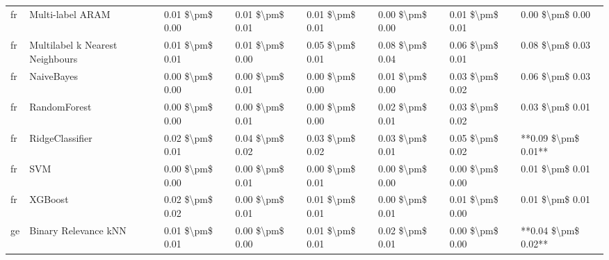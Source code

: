 \begin{tabular}{llllllll}
      fr &                Multi-label ARAM & 0.01 \$\textbackslash pm\$ 0.00 &           0.01 \$\textbackslash pm\$ 0.01 &       0.01 \$\textbackslash pm\$ 0.01 &        0.00 \$\textbackslash pm\$ 0.00 &                         0.01 \$\textbackslash pm\$ 0.01 &     0.00 \$\textbackslash pm\$ 0.00 \\
      fr & Multilabel k Nearest Neighbours & 0.01 \$\textbackslash pm\$ 0.01 &           0.01 \$\textbackslash pm\$ 0.00 &       0.05 \$\textbackslash pm\$ 0.01 &        0.08 \$\textbackslash pm\$ 0.04 &                         0.06 \$\textbackslash pm\$ 0.01 &     0.08 \$\textbackslash pm\$ 0.03 \\
      fr &                      NaiveBayes & 0.00 \$\textbackslash pm\$ 0.00 &           0.00 \$\textbackslash pm\$ 0.01 &       0.00 \$\textbackslash pm\$ 0.00 &        0.01 \$\textbackslash pm\$ 0.00 &                         0.03 \$\textbackslash pm\$ 0.02 &     0.06 \$\textbackslash pm\$ 0.03 \\
      fr &                    RandomForest & 0.00 \$\textbackslash pm\$ 0.00 &           0.00 \$\textbackslash pm\$ 0.01 &       0.00 \$\textbackslash pm\$ 0.00 &        0.02 \$\textbackslash pm\$ 0.01 &                         0.03 \$\textbackslash pm\$ 0.02 &     0.03 \$\textbackslash pm\$ 0.01 \\
      fr &                 RidgeClassifier & 0.02 \$\textbackslash pm\$ 0.01 &           0.04 \$\textbackslash pm\$ 0.02 &       0.03 \$\textbackslash pm\$ 0.02 &        0.03 \$\textbackslash pm\$ 0.01 &                         0.05 \$\textbackslash pm\$ 0.02 & **0.09 \$\textbackslash pm\$ 0.01** \\
      fr &                             SVM & 0.00 \$\textbackslash pm\$ 0.00 &           0.00 \$\textbackslash pm\$ 0.01 &       0.00 \$\textbackslash pm\$ 0.01 &        0.00 \$\textbackslash pm\$ 0.00 &                         0.00 \$\textbackslash pm\$ 0.00 &     0.01 \$\textbackslash pm\$ 0.01 \\
      fr &                         XGBoost & 0.02 \$\textbackslash pm\$ 0.02 &           0.00 \$\textbackslash pm\$ 0.01 &       0.01 \$\textbackslash pm\$ 0.01 &        0.00 \$\textbackslash pm\$ 0.01 &                         0.01 \$\textbackslash pm\$ 0.00 &     0.01 \$\textbackslash pm\$ 0.01 \\
      ge &            Binary Relevance kNN & 0.01 \$\textbackslash pm\$ 0.01 &           0.00 \$\textbackslash pm\$ 0.00 &       0.01 \$\textbackslash pm\$ 0.01 &        0.02 \$\textbackslash pm\$ 0.01 &                         0.00 \$\textbackslash pm\$ 0.00 & **0.04 \$\textbackslash pm\$ 0.02** \\

\end{tabular}
